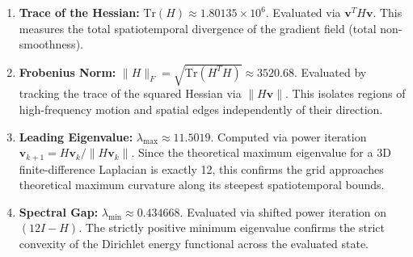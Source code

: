 \documentclass{article}
\begin{document}
\begin{enumerate}
    \item \textbf{Trace of the Hessian:} $\text{Tr}(H) \approx 1.80135 \times 10^6$. Evaluated via $\mathbf{v}^T H \mathbf{v}$. This measures the total spatiotemporal divergence of the gradient field (total non-smoothness).
    \item \textbf{Frobenius Norm:} $\|H\|_F = \sqrt{\text{Tr}(H^T H)} \approx 3520.68$. Evaluated by tracking the trace of the squared Hessian via $\|H \mathbf{v}\|$. This isolates regions of high-frequency motion and spatial edges independently of their direction.
    \item \textbf{Leading Eigenvalue:} $\lambda_{\max} \approx 11.5019$. Computed via power iteration $\mathbf{v}_{k+1} = H \mathbf{v}_k / \|H \mathbf{v}_k\|$. Since the theoretical maximum eigenvalue for a 3D finite-difference Laplacian is exactly 12, this confirms the grid approaches theoretical maximum curvature along its steepest spatiotemporal bounds.
    \item \textbf{Spectral Gap:} $\lambda_{\min} \approx 0.434668$. Evaluated via shifted power iteration on $(12I - H)$. The strictly positive minimum eigenvalue confirms the strict convexity of the Dirichlet energy functional across the evaluated state.
\end{enumerate}
\end{document}
